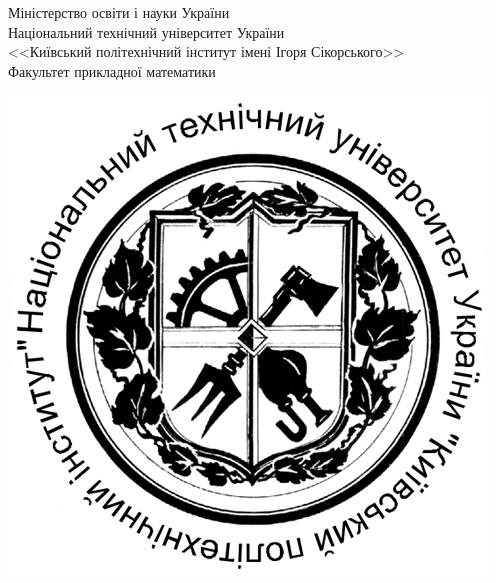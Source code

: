 \begin{titlepage}
    \newpage

    \begin{minipage}[c]{\linewidth}

        \newlength{\maxpreambula}

        \hspace{5cm}\parbox{\maxpreambula}{
            \begin{spacing}{1.1}\small{
                Міністерство освіти і науки України \\
                Національний технічний університет України \\
                <<Київський політехнічний інститут імені Ігоря Сікорського>> \\
                Факультет прикладної математики}
            \end{spacing}
        }
            
        \vspace*{-2.35cm}
        \hspace*{1.5cm}
        \includegraphics[width=0.13\paperwidth]{kpi_emblem.png}

    \end{minipage}
    
    \vspace{\fill}
    

\end{titlepage}
